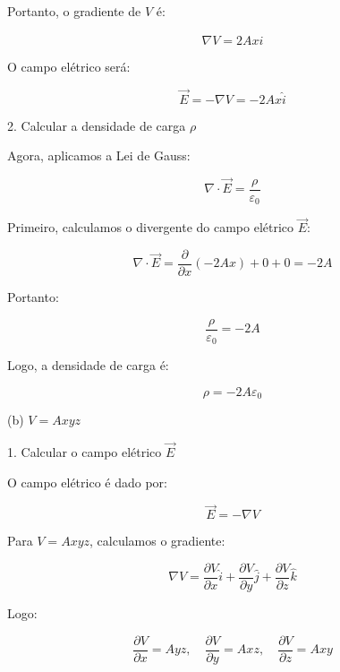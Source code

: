 \documentclass[a4paper,12pt]{article}
\begin{document}
\begin{flushleft}
Portanto, o gradiente de \(V\) é:

\begin{equation}
\nabla V = 2 A x \hat{i}
\end{equation}

O campo elétrico será:

\begin{equation}
\vec{E} = -\nabla V = - 2 A x \hat{i}
\end{equation}

2. Calcular a densidade de carga \( \rho \)

Agora, aplicamos a Lei de Gauss:

\begin{equation}
\nabla \cdot \vec{E} = \frac{\rho}{\varepsilon_0}
\end{equation}

Primeiro, calculamos o divergente do campo elétrico \( \vec{E} \):

\begin{equation}
\nabla \cdot \vec{E} = \frac{\partial}{\partial x} (-2 A x) + 0 + 0 = -2 A
\end{equation}

Portanto:

\begin{equation}
\frac{\rho}{\varepsilon_0} = -2 A
\end{equation}

Logo, a densidade de carga é:

\begin{equation}
\rho = -2 A \varepsilon_0
\end{equation}

(b) \( V = A x y z \)

1. Calcular o campo elétrico \( \vec{E} \)

O campo elétrico é dado por:

\begin{equation}
\vec{E} = -\nabla V
\end{equation}

Para \( V = A x y z \), calculamos o gradiente:

\begin{equation}
\nabla V = \frac{\partial V}{\partial x} \hat{i} + \frac{\partial V}{\partial y} \hat{j} + \frac{\partial V}{\partial z} \hat{k}
\end{equation}

Logo:

\begin{equation}
\frac{\partial V}{\partial x} = A y z, \quad \frac{\partial V}{\partial y} = A x z, \quad \frac{\partial V}{\partial z} = A x y
\end{equation}


\end{flushleft}
\end{document}
